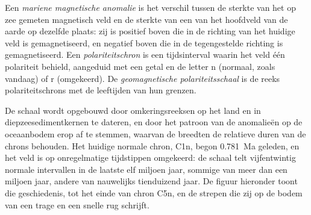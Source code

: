 \begin{definition}\label{def:b1:plate-kinematics:magnetic-anomaly}
Een \emph{mariene magnetische anomalie} is het verschil tussen de sterkte van het op zee gemeten magnetisch veld en de sterkte van een  van het hoofdveld van de aarde op dezelfde plaats: zij is positief boven  die in de richting van het huidige veld is gemagnetiseerd, en negatief boven  die in de tegengestelde richting is gemagnetiseerd. Een \emph{polariteitschron} is een tijdsinterval waarin het veld één polariteit behield, aangeduid met een getal en de letter n (normaal, zoals vandaag) of r (omgekeerd). De \emph{geomagnetische polariteitsschaal} is de reeks polariteitschrons met de leeftijden van hun grenzen.
\end{definition}

De schaal wordt opgebouwd door omkeringsreeksen op het land en in diepzeesedimentkernen te dateren, en door het patroon van de anomalieën op de oceaanbodem erop af te stemmen, waarvan de breedten de relatieve duren van de chrons behouden. Het huidige normale chron, C1n, begon \qty{0.781}{Ma} geleden, en het veld is op onregelmatige tijdstippen omgekeerd: de schaal telt vijfentwintig normale intervallen in de laatste elf miljoen jaar, sommige van meer dan een miljoen jaar, andere van nauwelijks tienduizend jaar. De figuur hieronder toont die geschiedenis, tot het einde van chron C5n, en de strepen die zij op de bodem van een trage en een snelle rug schrijft.

